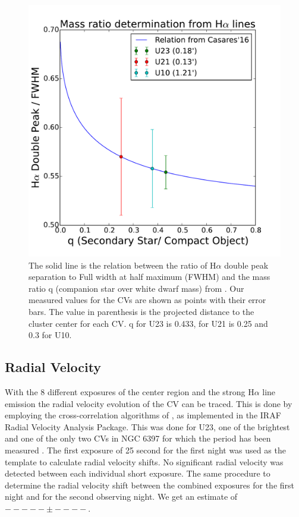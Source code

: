\begin{figure}[h]
        \centering
        \includegraphics[scale=.5]{assets/images/mass.pdf}
\caption{The solid line is the relation between the ratio of H$\alpha$ double peak separation to Full width at half maximum (FWHM) and the mass ratio q (companion star over white dwarf mass) from \cite{casares_massration_20016}. Our measured values for the CVs are shown as points with their error bars. The value in parenthesis is the projected distance to the cluster center for each CV. q for U23 is 0.433, for U21 is 0.25 and 0.3 for U10.}
\label{fig:mass}
\end{figure}

\subsection{Radial Velocity}

With the 8 different exposures of the center region and the strong H$\alpha$ line emission the radial velocity evolution of the CV can be traced. This is done by employing the cross-correlation algorithms of \cite{tonry_cross_1979}, as implemented in the IRAF Radial Velocity Analysis Package. This was done for U23, one of the brightest and one of the only two CVs in NGC 6397 for which the period has been measured \citep{kaluzny_time_2003}. The first exposure of 25 second for the first night was used as the template to calculate radial velocity shifts. No significant radial velocity was detected between each individual short exposure.  The same procedure to determine the radial velocity shift between the combined exposures for the first night and for the second observing night. We get an estimate of $----- \pm ----$.  


